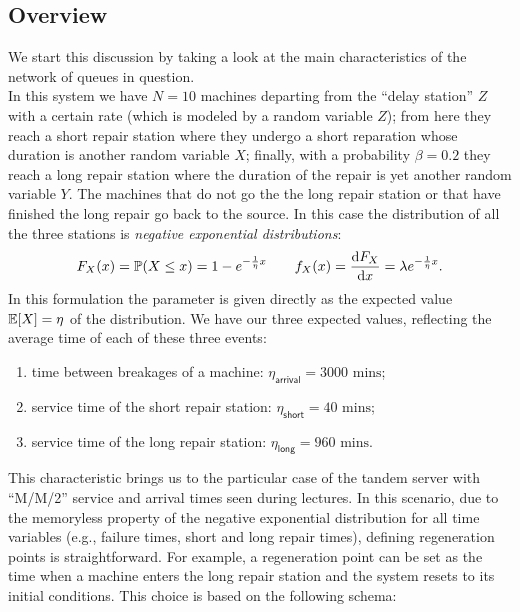 \documentclass[12pt]{article}
\begin{document}
	\subsection{Overview}
	We start this discussion by taking a look at the main characteristics of the network of queues in question.\\
	In this system we have $N=10$ machines departing from the ``delay station'' $Z$ with a certain rate (which is modeled by a random variable $Z$); from here they reach a short repair station where they undergo a short reparation whose duration is another random variable $X$; finally, with a probability $\beta=0.2$ they reach a long repair station where the duration of the repair is yet another random variable $Y$. The machines that do not go the the long repair station or that have finished the long repair go back to the source.
	In this case the distribution of all the three stations is \emph{negative exponential distributions}:
	\begin{equation*}
		F_X(x)=\mathbb{P}(X\leq x)=1-e^{-\frac{1}{\eta} x}\qquad f_X(x)=\frac{\mathop{}\!\mathrm{d} F_X}{\mathop{}\!\mathrm{d} x}=\lambda e^{-\frac{1}{\eta} x}.
	\end{equation*}
	In this formulation the parameter is given directly as the expected value $\mathbb{E}[X]=\eta$ of the distribution. We have our three expected values, reflecting the average time of each of these three events:
	\begin{enumerate}[\circnum]
		\item time between breakages of a machine: $\eta_{\mathsf{arrival}}=3000\text{ mins}$;
		\item service time of the short repair station: $\eta_{\mathsf{short}}=40\text{ mins}$;
		\item service time of the long repair station: $\eta_{\mathsf{long}}=960\text{ mins}$.
	\end{enumerate}
	This characteristic brings us to the particular case of the tandem server with ``M/M/2'' service and arrival times seen during lectures. 
In this scenario, due to the memoryless property of the negative exponential distribution for all time variables (e.g., failure times, short and long repair times), defining regeneration points is straightforward. For example, a regeneration point can be set as the time when a machine enters the long repair station and the system resets to its initial conditions. This choice is based on the following schema:
		
\end{document}

